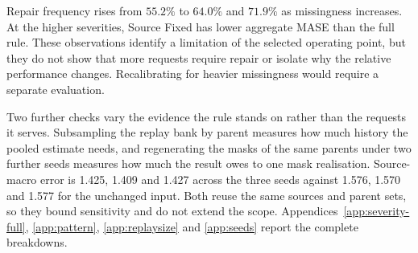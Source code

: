 \documentclass{article}
\begin{document}
Repair frequency rises from $55.2\%$ to $64.0\%$ and $71.9\%$ as missingness increases.
At the higher severities, Source Fixed has lower aggregate MASE than the full rule.
These observations identify a limitation of the selected operating point, but they do not
show that more requests require repair or isolate why the relative performance changes.
Recalibrating for heavier missingness would require a separate evaluation.

Two further checks vary the evidence the rule stands on rather than the requests it serves.
Subsampling the replay bank by parent measures how much history the pooled estimate needs, and
regenerating the masks of the same parents under two further seeds measures how much the
result owes to one mask realisation. Source-macro error is 1.425, 1.409 and 1.427 across
the three seeds against 1.576, 1.570 and 1.577 for the unchanged input.
Both reuse the same sources and parent sets, so they bound sensitivity and do not extend the
scope. Appendices~\ref{app:severity-full}, \ref{app:pattern}, \ref{app:replaysize} and
\ref{app:seeds} report the complete breakdowns.
\end{document}
